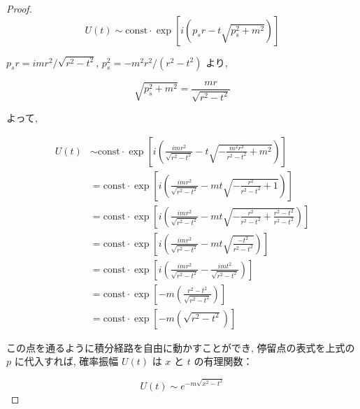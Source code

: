 \documentclass[a4paper,12pt]{article}
\begin{document}
\begin{proof}
\begin{equation*}
  U(t) \sim \textrm{const} \cdot \exp\left[i(p_s r - t\sqrt{p_s^2 + m^2})\right] \tag{2-1.c19}
\end{equation*}

$p_s r = imr^2/\sqrt{r^2 - t^2}$, $p_s^2 = -m^2 r^2/(r^2 - t^2)$ より,

\begin{equation*}
  \sqrt{p_s^2 + m^2} = \frac{mr}{\sqrt{r^2 - t^2}} \tag{2-1.c20}
\end{equation*}

よって,

\begin{align*}
  U(t) &\sim \textrm{const} \cdot \exp\left[i\left( \frac{imr^2}{\sqrt{r^2 - t^2}} - t \sqrt{-\frac{m^2 r^2}{r^2 - t^2} + m^2} \right)\right] \tag{2-1.c21} \\
  &= \textrm{const} \cdot \exp\left[i\left( \frac{imr^2}{\sqrt{r^2 - t^2}} - mt \sqrt{-\frac{ r^2}{r^2 - t^2} + 1} \right)\right] \tag{2-1.c22}\\
  &= \textrm{const} \cdot \exp\left[i\left( \frac{imr^2}{\sqrt{r^2 - t^2}} - mt \sqrt{-\frac{ r^2}{r^2 - t^2} + \frac{r^2 - t^2}{r^2 - t^2}} \right)\right] \tag{2-1.c23}\\
  &= \textrm{const} \cdot \exp\left[i\left( \frac{imr^2}{\sqrt{r^2 - t^2}} - mt \sqrt{\frac{-t^2}{r^2 - t^2}} \right)\right] \tag{2-1.c24}\\
  &= \textrm{const} \cdot \exp\left[i\left( \frac{imr^2}{\sqrt{r^2 - t^2}} - \frac{imt^2}{\sqrt{r^2 - t^2}} \right)\right] \tag{2-1.c25}\\
  &= \textrm{const} \cdot \exp\left[-m\left( \frac{r^2 - t^2}{\sqrt{r^2 - t^2}} \right)\right] \tag{2-1.c26}\\
  &= \textrm{const} \cdot \exp\left[-m\left( \sqrt{r^2 - t^2} \right)\right] \tag{2-1.c27}
\end{align*}



この点を通るように積分経路を自由に動かすことができ, 停留点の表式を上式の $p$ に代入すれば, 確率振幅 $U(t)$ は $x$ と $t$ の有理関数：

\begin{equation*}
  U(t) \sim e^{-m\sqrt{x^2 - t^2}}
\end{equation*}
















\end{proof}
\end{document}
